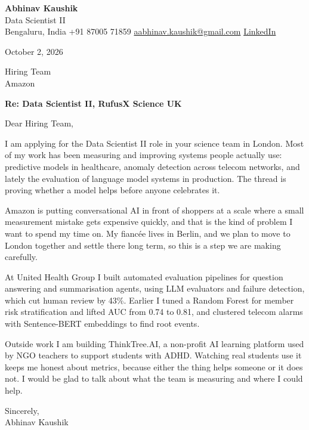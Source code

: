 \documentclass[11pt,a4paper]{article}
\begin{document}
{\Large\bfseries Abhinav Kaushik}\\
Data Scientist II\\
Bengaluru, India \textbar{} +91 87005 71859 \textbar{} \href{mailto:aabhinav.kaushik@gmail.com}{aabhinav.kaushik@gmail.com} \textbar{} \href{https://www.linkedin.com/in/abhinav-kaushik10/}{LinkedIn}  

October 2, 2026

Hiring Team\\
Amazon

\textbf{Re: Data Scientist II, RufusX Science UK}

Dear Hiring Team,

I am applying for the Data Scientist II role in your science team in London. Most of my work has been measuring and improving systems people actually use: predictive models in healthcare, anomaly detection across telecom networks, and lately the evaluation of language model systems in production. The thread is proving whether a model helps before anyone celebrates it.

Amazon is putting conversational AI in front of shoppers at a scale where a small measurement mistake gets expensive quickly, and that is the kind of problem I want to spend my time on. My fiancée lives in Berlin, and we plan to move to London together and settle there long term, so this is a step we are making carefully.

At United Health Group I built automated evaluation pipelines for question answering and summarisation agents, using LLM evaluators and failure detection, which cut human review by 43\%. Earlier I tuned a Random Forest for member risk stratification and lifted AUC from 0.74 to 0.81, and clustered telecom alarms with Sentence-BERT embeddings to find root events.

Outside work I am building ThinkTree.AI, a non-profit AI learning platform used by NGO teachers to support students with ADHD. Watching real students use it keeps me honest about metrics, because either the thing helps someone or it does not. I would be glad to talk about what the team is measuring and where I could help.

Sincerely,\\[4pt]
Abhinav Kaushik
\end{document}
